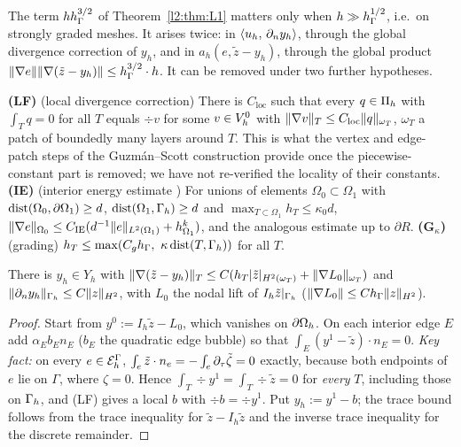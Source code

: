 The term $hh_\Gamma^{3/2}$ of Theorem~\ref{l2:thm:L1} matters only when $h\gg h_\Gamma^{1/2}$, i.e.\ on strongly graded meshes. It arises twice: in $\langle u_h,\, \partial_n y_h\rangle$, through the global divergence correction of $y_h$, and in $a_h(e,\tilde z-y_h)$, through the global product $\lVert \nabla e\rVert\lVert \nabla(\tilde z-y_h)\rVert\le h_\Gamma^{3/2}\cdot h$. It can be removed under two further hypotheses.

\begin{assumption}\label{l2:ass:G}
\textbf{(LF)} (local divergence correction) There is $C_{\mathrm{loc}}$ such that every $q\in\Pi_h$ with $\int_Tq=0$ for all $T$ equals $\div v$ for some $v\in V_h^0$ with $\lVert \nabla v\rVert_T\le C_{\mathrm{loc}}\lVert q\rVert_{\omega_T}$, $\omega_T$ a patch of boundedly many layers around $T$. This is what the vertex and edge-patch steps of the Guzm\'an--Scott construction provide once the piecewise-constant part is removed; we have not re-verified the locality of their constants.
\textbf{(IE)} (interior energy estimate \cite{ArnoldLiu1995}) For unions of elements $\Omega_0\subset\Omega_1$ with $\operatorname{dist}(\Omega_0,\partial\Omega_1)\ge d$, $\operatorname{dist}(\Omega_1,\Gamma_h)\ge d$ and $\max_{T\subset\Omega_1}h_T\le\kappa_0d$, $\lVert \nabla e\rVert_{\Omega_0}\le C_{\mathrm{IE}}(d^{-1}\lVert e\rVert_{L^2(\Omega_1)}+h_{\Omega_1}^k)$, and the analogous estimate up to $\partial R$.
\textbf{(G$_\kappa$)} (grading) $h_T\le\max(C_g\hG,\ \kappa\dist(T,\Gh))$ for all $T$.
\end{assumption}

\begin{lemma}\label{l2:lem:G1}
There is $y_h\in Y_h$ with $\lVert \nabla(\tilde z-y_h)\rVert_T\le C(h_T|\tilde z|_{H^2(\omega_T)}+\lVert \nabla L_0\rVert_{\omega_T})$ and $\lVert \partial_n y_h\rVert_{\Gamma_h}\le C\lVert z\rVert_{H^2}$, with $L_0$ the nodal lift of $I_h\tilde z|_{\Gamma_h}$ ($\lVert \nabla L_0\rVert\le Ch_\Gamma\lVert z\rVert_{H^2}$).
\end{lemma}

\begin{proof}
Start from $y^0:=I_h\tilde z-L_0$, which vanishes on $\partial\Omega_h$. On each interior edge $E$ add $\alpha_Eb_En_E$ ($b_E$ the quadratic edge bubble) so that $\int_E(y^1-\tilde z)\cdot n_E=0$. \emph{Key fact:} on every $e\in\mathcal E_h^\Gamma$, $\int_e\tilde z\cdot n_e=-\int_e\partial_\tau\tilde\zeta=0$ exactly, because both endpoints of $e$ lie on $\Gamma$, where $\zeta=0$. Hence $\int_T\div y^1=\int_T\div\tilde z=0$ for \emph{every} $T$, including those on $\Gamma_h$, and (LF) gives a local $b$ with $\div b=\div y^1$. Put $y_h:=y^1-b$; the trace bound follows from the trace inequality for $\tilde z-I_h\tilde z$ and the inverse trace inequality for the discrete remainder.
\end{proof}

